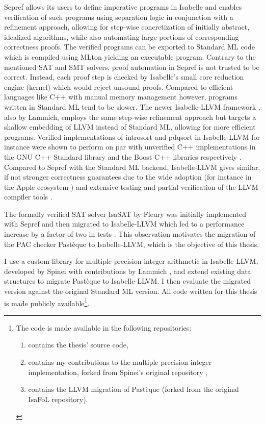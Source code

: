 Sepref allows its users to define imperative programs in Isabelle and enables verification of such programs using separation logic in conjunction with a refinement approach, allowing for step-wise concretization of initially abstract, idealized algorithms, while also automating large portions of corresponding correctness proofs.
The verified programs can be exported to Standard ML code which is compiled using MLton \cite{mlton, weeks-mlton-2006} yielding an executable program.
Contrary to the mentioned SAT and SMT solvers, proof automation in Sepref is not trusted to be correct.
Instead, each proof step is checked by Isabelle's small core reduction engine (kernel) which would reject unsound proofs.
Compared to efficient languages like C++ with manual memory management however, programs written in Standard ML tend to be slower.
The newer Isabelle-LLVM framework \cite{isabelle-llvm}, also by Lammich, employs the same step-wise refinement approach but targets a shallow embedding of LLVM instead of Standard ML, allowing for more efficient programs.
Verified implementations of introsort \cite{introsort} and pdqsort in Isabelle-LLVM for instance were shown to perform on par with unverified C++ implementations in the GNU C++ Standard library and the Boost C++ libraries \cite{boost-pdqsort} respectively \cite{isabelle-llvm-sort}.
Compared to Sepref with the Standard ML backend, Isabelle-LLVM gives similar, if not stronger correctness guarantees due to the wide adoption (for instance in the Apple ecosystem \cite{acm2012llvm}) and extensive testing and partial verification of the LLVM compiler tools \cite{alive2, Csmith}.

The formally verified SAT solver IsaSAT by Fleury \cite{isasat-sml} was initially implemented with Sepref and then migrated to Isabelle-LLVM which led to a performance increase by a factor of two in tests \cite{isasat-llvm}.
This observation motivates the migration of the PAC checker Pastèque to Isabelle-LLVM, which is the objective of this thesis.

I use a custom library for multiple precision integer arithmetic in Isabelle-LLVM, developed by Spinei with contributions by Lammich \cite{spinei_isabelle_big_integer}, and extend existing data structures to migrate Pastèque to Isabelle-LLVM.
I then evaluate the migrated version against the original Standard ML version.
All code written for this thesis is made publicly available\footnote{
	The code is made available in the following repositories:
	\begin{enumerate}
		\item {} contains the thesis' source code,
		\item {} contains my contributions to the multiple precision integer implementation, forked from Spinei's original repository \cite{spinei_isabelle_big_integer},
		\item {} contains the LLVM migration of Pastèque (forked from the original IsaFoL \cite{isafol} repository).
	\end{enumerate}
}.

